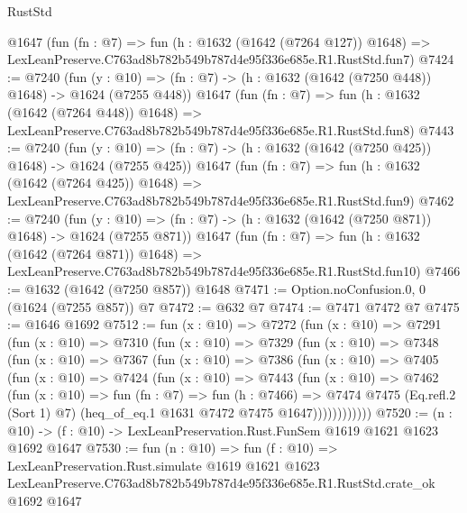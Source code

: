 \begin{lexlean}{RustStd}
\begin{coremodule}
    @1647
    (fun (fn : @7) =>
    fun (h : @1632 (@1642 (@7264 @127)) @1648) =>
    LexLeanPreserve.C763ad8b782b549b787d4e95f336e685e.R1.RustStd.fun7)
@7424 := @7240
    (fun (y : @10) => (fn : @7) -> (h : @1632 (@1642 (@7250 @448)) @1648) -> @1624 (@7255 @448))
    @1647
    (fun (fn : @7) =>
    fun (h : @1632 (@1642 (@7264 @448)) @1648) =>
    LexLeanPreserve.C763ad8b782b549b787d4e95f336e685e.R1.RustStd.fun8)
@7443 := @7240
    (fun (y : @10) => (fn : @7) -> (h : @1632 (@1642 (@7250 @425)) @1648) -> @1624 (@7255 @425))
    @1647
    (fun (fn : @7) =>
    fun (h : @1632 (@1642 (@7264 @425)) @1648) =>
    LexLeanPreserve.C763ad8b782b549b787d4e95f336e685e.R1.RustStd.fun9)
@7462 := @7240
    (fun (y : @10) => (fn : @7) -> (h : @1632 (@1642 (@7250 @871)) @1648) -> @1624 (@7255 @871))
    @1647
    (fun (fn : @7) =>
    fun (h : @1632 (@1642 (@7264 @871)) @1648) =>
    LexLeanPreserve.C763ad8b782b549b787d4e95f336e685e.R1.RustStd.fun10)
@7466 := @1632 (@1642 (@7250 @857)) @1648
@7471 := Option.noConfusion.{0, 0} (@1624 (@7255 @857)) @7
@7472 := @632 @7
@7474 := @7471 @7472 @7
@7475 := @1646 @1692
@7512 := fun (x : @10) =>
  @7272
    (fun (x : @10) =>
    @7291
      (fun (x : @10) =>
      @7310
        (fun (x : @10) =>
        @7329
          (fun (x : @10) =>
          @7348
            (fun (x : @10) =>
            @7367
              (fun (x : @10) =>
              @7386
                (fun (x : @10) =>
                @7405
                  (fun (x : @10) =>
                  @7424
                    (fun (x : @10) =>
                    @7443
                      (fun (x : @10) =>
                      @7462
                        (fun (x : @10) =>
                        fun (fn : @7) =>
                        fun (h : @7466) =>
                        @7474
                          @7475
                          (Eq.refl.{2} (Sort 1) @7)
                          (heq_of_eq.{1} @1631 @7472 @7475 @1647))))))))))))
@7520 := (n : @10) -> (f : @10) -> LexLeanPreservation.Rust.FunSem @1619 @1621 @1623 @1692 @1647
@7530 := fun (n : @10) =>
  fun (f : @10) =>
  LexLeanPreservation.Rust.simulate
    @1619
    @1621
    @1623
    LexLeanPreserve.C763ad8b782b549b787d4e95f336e685e.R1.RustStd.crate_ok
    @1692
    @1647
\end{coremodule}
\end{lexlean}
